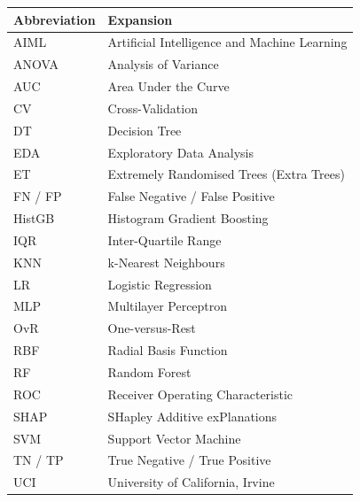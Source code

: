 \begin{table}[h!]
\centering
\begin{tabular}{ll}
\toprule
\textbf{Abbreviation} & \textbf{Expansion} \\
\midrule
AIML & Artificial Intelligence and Machine Learning \\
ANOVA & Analysis of Variance \\
AUC & Area Under the Curve \\
CV & Cross-Validation \\
DT & Decision Tree \\
EDA & Exploratory Data Analysis \\
ET & Extremely Randomised Trees (Extra Trees) \\
FN / FP & False Negative / False Positive \\
HistGB & Histogram Gradient Boosting \\
IQR & Inter-Quartile Range \\
KNN & k-Nearest Neighbours \\
LR & Logistic Regression \\
MLP & Multilayer Perceptron \\
OvR & One-versus-Rest \\
RBF & Radial Basis Function \\
RF & Random Forest \\
ROC & Receiver Operating Characteristic \\
SHAP & SHapley Additive exPlanations \\
SVM & Support Vector Machine \\
TN / TP & True Negative / True Positive \\
UCI & University of California, Irvine \\
\bottomrule
\end{tabular}
\end{table}
